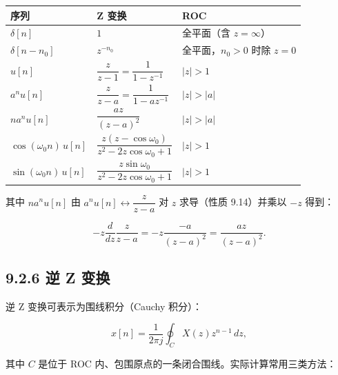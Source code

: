 {\def\LTcaptype{none} %
\begin{longtable}[]{@{}
  >{\raggedright\arraybackslash}p{}
  >{\raggedright\arraybackslash}p{}
  >{\raggedright\arraybackslash}p{}@{}}
\toprule\noalign{}
\begin{minipage}[b]{\linewidth}\raggedright
序列
\end{minipage} & \begin{minipage}[b]{\linewidth}\raggedright
Z 变换
\end{minipage} & \begin{minipage}[b]{\linewidth}\raggedright
ROC
\end{minipage} \\
\midrule\noalign{}
\endhead
\bottomrule\noalign{}
\endlastfoot
\(\delta[n]\) & \(1\) & 全平面（含 \(z=\infty\)） \\
\(\delta[n-n_0]\) & \(z^{-n_0}\) & 全平面，\(n_0>0\) 时除 \(z=0\) \\
\(u[n]\) & \(\dfrac{z}{z-1}=\dfrac{1}{1-z^{-1}}\) & \(|z|>1\) \\
\(a^n u[n]\) & \(\dfrac{z}{z-a}=\dfrac{1}{1-a z^{-1}}\) & \(|z|>|a|\) \\
\(n a^n u[n]\) & \(\dfrac{az}{(z-a)^2}\) & \(|z|>|a|\) \\
\(\cos(\omega_0 n)\,u[n]\) &
\(\dfrac{z(z-\cos\omega_0)}{z^2-2z\cos\omega_0+1}\) & \(|z|>1\) \\
\(\sin(\omega_0 n)\,u[n]\) &
\(\dfrac{z\sin\omega_0}{z^2-2z\cos\omega_0+1}\) & \(|z|>1\) \\
\end{longtable}
}

其中 \(n a^n u[n]\) 由 \(a^n u[n]\leftrightarrow\dfrac{z}{z-a}\) 对
\(z\) 求导（性质 9.14）并乘以 \(-z\) 得到：

\[
- z\frac{d}{dz}\frac{z}{z-a} = -z\frac{-a}{(z-a)^2} = \frac{az}{(z-a)^2}.
\]

\subsection{9.2.6 逆 Z 变换}\label{ux9006-z-ux53d8ux6362}

逆 Z 变换可表示为围线积分（Cauchy 积分）：

\[
x[n]=\frac{1}{2\pi j}\oint_C X(z) z^{n-1}\,dz,
\]

其中 \(C\) 是位于 ROC 内、包围原点的一条闭合围线。实际计算常用三类方法：

